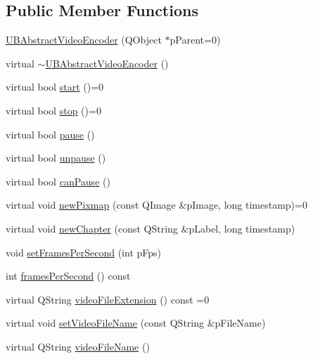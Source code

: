 \subsection*{Public Member Functions}
\begin{DoxyCompactItemize}
\item 
\hyperlink{class_u_b_abstract_video_encoder_ab9656acba80cfe74980b16dc90423b73}{U\-B\-Abstract\-Video\-Encoder} (Q\-Object $\ast$p\-Parent=0)
\item 
virtual \hyperlink{class_u_b_abstract_video_encoder_a33d1abd59a213d0c9ff9776a8478c709}{$\sim$\-U\-B\-Abstract\-Video\-Encoder} ()
\item 
virtual bool \hyperlink{class_u_b_abstract_video_encoder_aa56593934a8cf8d04135131db547833e}{start} ()=0
\item 
virtual bool \hyperlink{class_u_b_abstract_video_encoder_a801e301615033b92ead75e531edb9c02}{stop} ()=0
\item 
virtual bool \hyperlink{class_u_b_abstract_video_encoder_ae871a77aeda9ccb98efeb85db2889446}{pause} ()
\item 
virtual bool \hyperlink{class_u_b_abstract_video_encoder_a99dada54baedf71288f70c78dcf6ac1a}{unpause} ()
\item 
virtual bool \hyperlink{class_u_b_abstract_video_encoder_a6fdee9e00977574dde3094ad5e536d91}{can\-Pause} ()
\item 
virtual void \hyperlink{class_u_b_abstract_video_encoder_ab74514eba01c7b8dcce926934dd6838a}{new\-Pixmap} (const Q\-Image \&p\-Image, long timestamp)=0
\item 
virtual void \hyperlink{class_u_b_abstract_video_encoder_a51c1523562454b18ea4066b5a4c805e2}{new\-Chapter} (const Q\-String \&p\-Label, long timestamp)
\item 
void \hyperlink{class_u_b_abstract_video_encoder_a6255653005e6a14f455f1948591db794}{set\-Frames\-Per\-Second} (int p\-Fps)
\item 
int \hyperlink{class_u_b_abstract_video_encoder_a2188fa51abf5736939cb971c8030f54c}{frames\-Per\-Second} () const 
\item 
virtual Q\-String \hyperlink{class_u_b_abstract_video_encoder_a8feffc37810d5b9ee249545028c65cae}{video\-File\-Extension} () const =0
\item 
virtual void \hyperlink{class_u_b_abstract_video_encoder_ad818fe4bbe2eca67923e9ddcc6b55950}{set\-Video\-File\-Name} (const Q\-String \&p\-File\-Name)
\item 
virtual Q\-String \hyperlink{class_u_b_abstract_video_encoder_ab8322081d835d9045ab9c7cc4845c2a7}{video\-File\-Name} ()

\end{DoxyCompactItemize}
